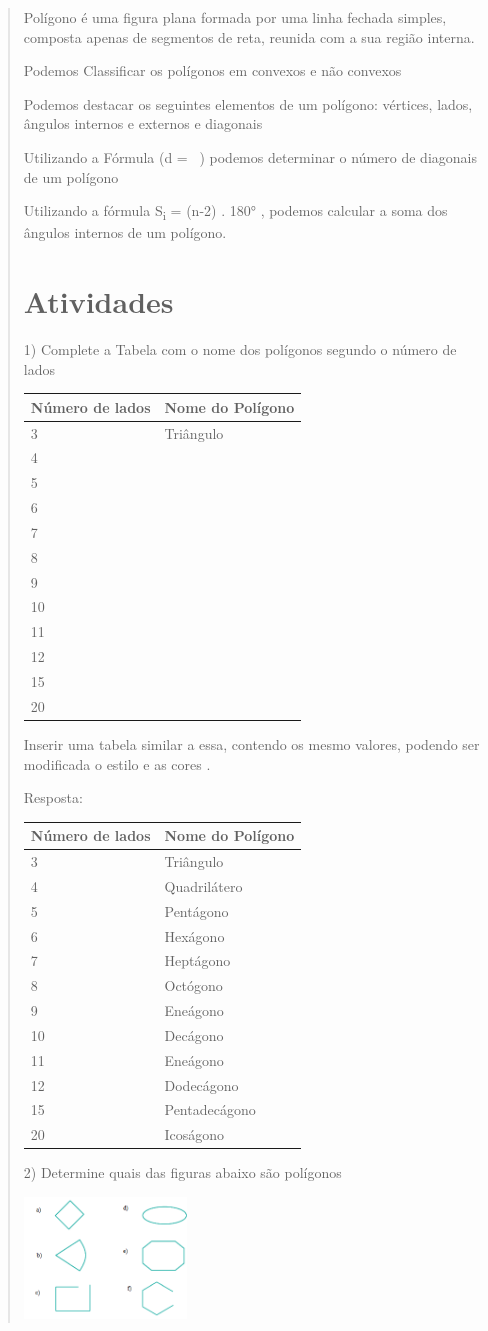 \begin{quote}
\begin{escolha}
Polígono é uma figura plana formada por uma linha fechada simples,
composta apenas de segmentos de reta, reunida com a sua região interna.

Podemos Classificar os polígonos em convexos e não convexos

Podemos destacar os seguintes elementos de um polígono: vértices, lados,
ângulos internos e externos e diagonais

Utilizando a Fórmula (d = \ ) podemos determinar o
número de diagonais de um polígono

Utilizando a fórmula S\textsubscript{i} = (n-2) . 180° , podemos
calcular a soma dos ângulos internos de um polígono.

\section{Atividades}

1) Complete a Tabela com o nome dos polígonos segundo o número de lados

\begin{longtable}[]{@{}ll@{}}
\toprule
Número de lados & Nome do Polígono\tabularnewline
\midrule
\endhead
3 & Triângulo\tabularnewline
4 & ~\tabularnewline
5 & ~\tabularnewline
6 & ~\tabularnewline
7 & ~\tabularnewline
8 & ~\tabularnewline
9 & ~\tabularnewline
10 & ~\tabularnewline
11 & ~\tabularnewline
12 & ~\tabularnewline
15 & ~\tabularnewline
20 & ~\tabularnewline
\bottomrule
\end{longtable}

Inserir uma tabela similar a essa, contendo os mesmo valores, podendo
ser modificada o estilo e as cores .

Resposta:

\begin{longtable}[]{@{}ll@{}}
\toprule
Número de lados & Nome do Polígono\tabularnewline
\midrule
\endhead
3 & Triângulo\tabularnewline
4 & Quadrilátero\tabularnewline
5 & Pentágono\tabularnewline
6 & Hexágono\tabularnewline
7 & Heptágono\tabularnewline
8 & Octógono\tabularnewline
9 & Eneágono\tabularnewline
10 & Decágono\tabularnewline
11 & Eneágono\tabularnewline
12 & Dodecágono\tabularnewline
15 & Pentadecágono\tabularnewline
20 & Icoságono\tabularnewline
\bottomrule
\end{longtable}

2) Determine quais das figuras abaixo são polígonos

\includegraphics[width=1.7in,height=1.26763in]{./imgSAEB_8_MAT/media/image7.png}


\end{escolha}
\end{quote}
